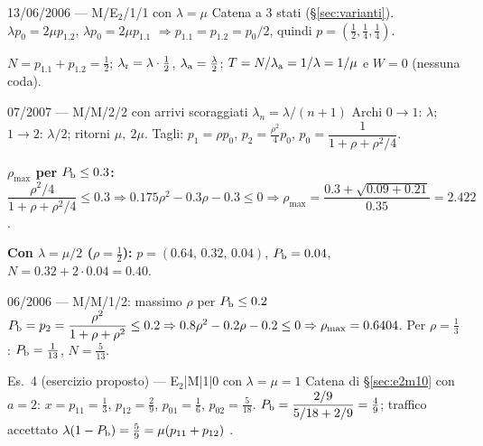 \begin{esempio}{13/06/2006 --- M/E$_2$/1/1 con $\lambda=\mu$}
Catena a 3 stati (§\ref{sec:varianti}). $\lambda p_0=2\mu p_{1.2}$, $\lambda p_0=2\mu p_{1.1}$ $\Rightarrow p_{1.1}=p_{1.2}=p_0/2$, quindi $p=(\tfrac12,\tfrac14,\tfrac14)$.

$N=p_{1.1}+p_{1.2}=\tfrac12$; $\lambda_{\mathrm{r}}=\lambda\cdot\tfrac12$, $\lambda_{\mathrm{a}}=\tfrac\lambda2$; $T=N/\lambda_{\mathrm{a}}=1/\lambda=1/\mu$ e $W=0$ (nessuna coda).
\end{esempio}

\begin{esempio}{07/2007 --- M/M/2/2 con arrivi scoraggiati $\lambda_n=\lambda/(n+1)$}
Archi $0\to1$: $\lambda$; $1\to2$: $\lambda/2$; ritorni $\mu,\ 2\mu$. Tagli: $p_1=\rho p_0$, $p_2=\tfrac{\rho^2}{4}p_0$, $p_0=\dfrac{1}{1+\rho+\rho^2/4}$.

\textbf{$\rho_{\max}$ per $P_{\mathrm{b}}\le0.3$:}
$\dfrac{\rho^2/4}{1+\rho+\rho^2/4}\le0.3\Rightarrow0.175\rho^2-0.3\rho-0.3\le0\Rightarrow\rho_{\max}=\dfrac{0.3+\sqrt{0.09+0.21}}{0.35}=2.422$.

\textbf{Con $\lambda=\mu/2$ ($\rho=\tfrac12$):} $p=(0.64,\,0.32,\,0.04)$, $P_{\mathrm{b}}=0.04$, $N=0.32+2\cdot0.04=0.40$.
\end{esempio}

\begin{esempio}{06/2006 --- M/M/1/2: massimo $\rho$ per $P_{\mathrm{b}}\le 0.2$}
$P_{\mathrm{b}}=p_2=\dfrac{\rho^2}{1+\rho+\rho^2}\le0.2\Rightarrow0.8\rho^2-0.2\rho-0.2\le0\Rightarrow\rho_{\max}=0.6404$.
Per $\rho=\tfrac13$: $P_{\mathrm{b}}=\tfrac1{13}$, $N=\tfrac5{13}$.
\end{esempio}

\begin{esempio}{Es.~4 (esercizio proposto) --- E$_2$|M|1|0 con $\lambda=\mu=1$}
Catena di §\ref{sec:e2m10} con $a=2$: $x=p_{11}=\tfrac13$, $p_{12}=\tfrac29$, $p_{01}=\tfrac16$, $p_{02}=\tfrac5{18}$.
$P_{\mathrm{b}}=\dfrac{2/9}{5/18+2/9}=\tfrac49$; traffico accettato $\lambda(1-P_{\mathrm{b}})=\tfrac59=\mu(p_{11}+p_{12})$ \checkmark.\mio
\end{esempio}

